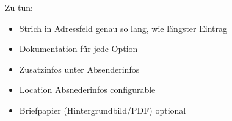 \documentclass[twoside]{brbrief}
\begin{document}
	\maketitle{}
	
	\lipsum[1-2]
	
	Zu tun:
	\begin{itemize}
		\item Strich in Adressfeld genau so lang, wie längster Eintrag
		\item Dokumentation für jede Option
		\item Zusatzinfos unter Absenderinfos
		\item Location Absnederinfos configurable
		\item Briefpapier (Hintergrundbild/PDF) optional
	\end{itemize}
	
	
	
	
	
	
\end{document}

